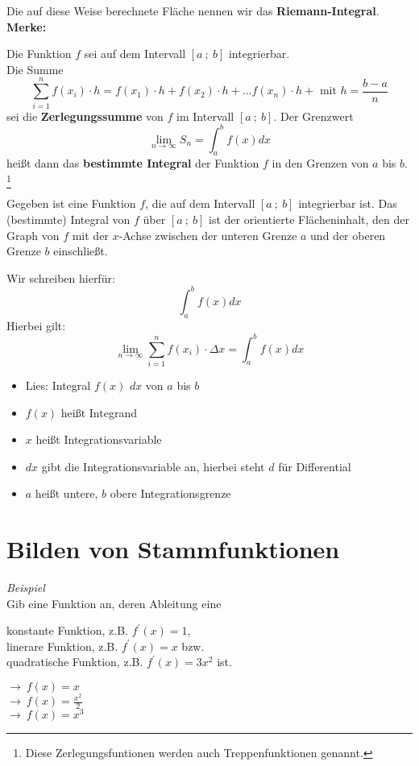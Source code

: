 Die auf diese Weise berechnete Fläche nennen wir das \textbf{Riemann-Integral}. \\

\textbf{Merke:}

Die Funktion $f$ sei auf dem Intervall $[a \ ; \ b]$ integrierbar.\\
Die Summe $$\sum^n_{i=1}f(x_i)\cdot h = f(x_1) \cdot h + f(x_2) \cdot h + ... f(x_n) \cdot h + \text{ mit } h = \frac{b - a}{n}$$ sei die \textbf{Zerlegungssumme} von $f$ im Intervall $[a \ ; \ b]$. Der Grenzwert $$\lim_{n \to \infty} S_n = \int_a^bf(x) dx$$ heißt dann das \textbf{bestimmte Integral} der Funktion $f$ in den Grenzen von $a$ bis $b$. \footnote{Diese Zerlegungsfuntionen werden auch Treppenfunktionen genannt.}


\begin{definition}
    Gegeben ist eine Funktion $f$, die auf dem Intervall $[a \ ; \ b]$ integrierbar ist. Das (bestimmte) Integral von $f$ über $[a \ ; \ b]$ ist der orientierte Flächeninhalt, den der Graph von $f$ mit der $x$-Achse zwischen der unteren Grenze $a$ und der oberen Grenze $b$ einschließt.
    
    Wir schreiben hierfür: $$\int_a^bf(x) dx$$
    Hierbei gilt: $$\lim_{n \to \infty} \sum^n_{i = 1}f(x_i) \cdot \Delta x = \int_a^bf(x) dx$$
    \begin{itemize}
        \item Lies: Integral $f(x)$ $dx$ von $a$ bis $b$
        \item $f(x)$ heißt Integrand
        \item $x$ heißt Integrationsvariable
        \item $dx$ gibt die Integrationsvariable an, hierbei steht $d$ für Differential
        \item $a$ heißt untere, $b$ obere Integrationsgrenze
    \end{itemize}
\end{definition}

\section{Bilden von Stammfunktionen}
\textit{Beispiel} \\
Gib eine Funktion an, deren Ableitung eine

\begin{minipage}{0.75\textwidth}
    konstante Funktion, z.B. $f^\prime(x) = 1$, \\
    linerare Funktion, z.B. $f^\prime(x) = x$ bzw. \\
    quadratische Funktion, z.B. $f^\prime(x) = 3x^2$ ist. \\
\end{minipage}
\begin{minipage}{0.25\textwidth}
    $\to \ f(x) = x$ \\
    $\to \ f(x) = \frac{x^2}{2}$ \\
    $\to \ f(x) = x^3$ \\
\end{minipage}

